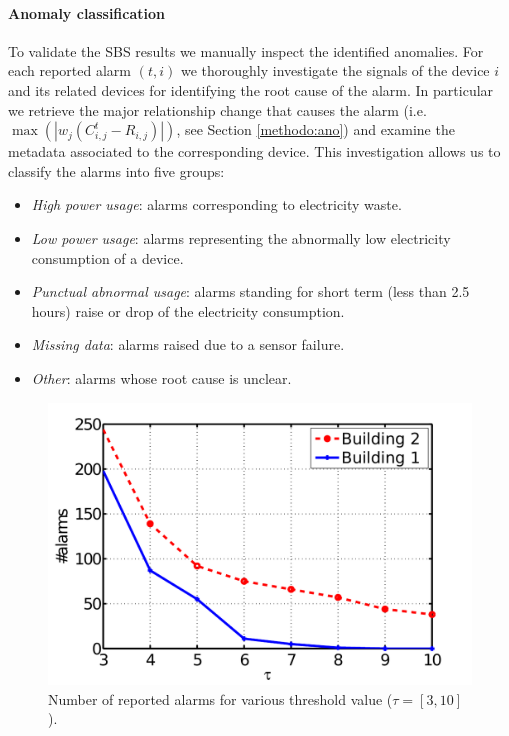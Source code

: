 \paragraph{Anomaly classification}
To validate the SBS results we manually inspect the identified anomalies.
For each reported alarm $(t,i)$ we thoroughly investigate the signals of the device $i$ and its related devices for identifying the root cause of the alarm.
In particular we retrieve the major relationship change that causes the alarm (i.e. $\max(|w_j(C_{i,j}^t - R_{i,j})|)$, see Section \ref{methodo:ano}) and examine the metadata associated to the corresponding device.
This investigation allows us to classify the alarms into five groups:
\begin{itemize}
 \item \emph{High power usage}: alarms corresponding to electricity waste.
 \item \emph{Low power usage}: alarms representing the abnormally low electricity consumption of a device.
 \item \emph{Punctual abnormal usage}: alarms standing for short term (less than 2.5 hours) raise or drop of the electricity consumption.
 \item \emph{Missing data}: alarms raised due to a sensor failure.
 \item \emph{Other}: alarms whose root cause is unclear.
\end{itemize}


\begin{figure}
\begin{center}
 \includegraphics[width=.49\textwidth]{img/threshold-eps-converted-to.pdf}
 \caption{Number of reported alarms for various threshold value ($\tau=[3,10]$).}
 \label{fig:thres}
 \end{center}
\end{figure}

